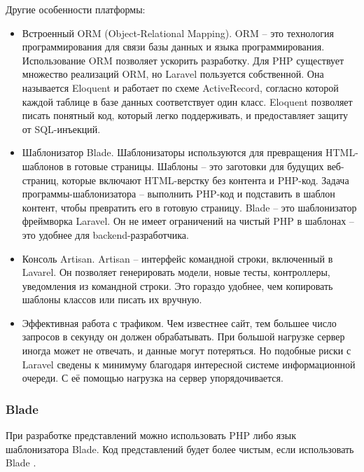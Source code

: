 Другие особенности платформы:
\begin{itemize}
	\item Встроенный ORM (Object-Relational Mapping). ORM -- это технология программирования для связи базы данных и языка программирования. Использование ORM позволяет ускорить разработку. Для PHP существует множество реализаций ORM, но Laravel пользуется собственной. Она называется Eloquent и работает по схеме ActiveRecord, согласно которой каждой таблице в базе данных соответствует один класс. Eloquent позволяет писать понятный код, который легко поддерживать, и предоставляет защиту от SQL-инъекций.
	\item Шаблонизатор Blade. Шаблонизаторы используются для превращения HTML-шаблонов в готовые страницы. Шаблоны -- это заготовки для будущих веб-страниц, которые включают HTML-верстку без контента и PHP-код. Задача программы-шаблонизатора -- выполнить PHP-код и подставить в шаблон контент, чтобы превратить его в готовую страницу. Blade -- это шаблонизатор фреймворка Laravel. Он не имеет ограничений на чистый PHP в шаблонах -- это удобнее для backend-разработчика.
	\item Консоль Artisan. Artisan -- интерфейс командной строки, включенный в Lavarel. Он позволяет генерировать модели, новые тесты, контроллеры, уведомления из командной строки. Это гораздо удобнее, чем копировать шаблоны классов или писать их вручную.
	\item Эффективная работа с трафиком. Чем известнее сайт, тем большее число запросов в секунду он должен обрабатывать. При большой нагрузке сервер иногда может не отвечать, и данные могут потеряться. Но подобные риски с Laravel сведены к минимуму благодаря интересной системе информационной очереди. С её помощью нагрузка на сервер упорядочивается.
\end{itemize}

\subsubsection{Blade}

При разработке представлений можно использовать PHP либо язык шаблонизатора Blade. Код представлений будет более чистым, если использовать Blade \cite{kirichenko}.

